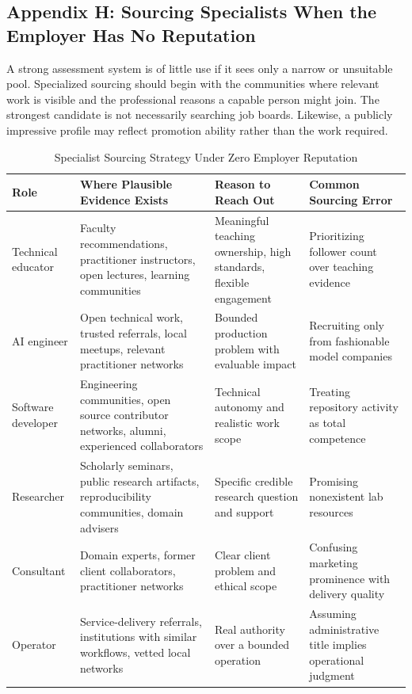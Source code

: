 \subsection*{Appendix H: Sourcing Specialists When the Employer Has No Reputation}

A strong assessment system is of little use if it sees only a narrow or unsuitable pool. Specialized sourcing should begin with the communities where relevant work is visible and the professional reasons a capable person might join. The strongest candidate is not necessarily searching job boards. Likewise, a publicly impressive profile may reflect promotion ability rather than the work required.

\begin{table}[t]
\centering
\small
\caption{Specialist Sourcing Strategy Under Zero Employer Reputation}
\label{tab:specialist_sourcing}
\begin{tabularx}{\textwidth}{p{2.5cm} p{4.6cm} p{4.2cm} p{4.2cm}}
\toprule
\textbf{Role} & \textbf{Where Plausible Evidence Exists} & \textbf{Reason to Reach Out} & \textbf{Common Sourcing Error} \\
\midrule
Technical educator & Faculty recommendations, practitioner instructors, open lectures, learning communities & Meaningful teaching ownership, high standards, flexible engagement & Prioritizing follower count over teaching evidence \\
AI engineer & Open technical work, trusted referrals, local meetups, relevant practitioner networks & Bounded production problem with evaluable impact & Recruiting only from fashionable model companies \\
Software developer & Engineering communities, open source contributor networks, alumni, experienced collaborators & Technical autonomy and realistic work scope & Treating repository activity as total competence \\
Researcher & Scholarly seminars, public research artifacts, reproducibility communities, domain advisers & Specific credible research question and support & Promising nonexistent lab resources \\
Consultant & Domain experts, former client collaborators, practitioner networks & Clear client problem and ethical scope & Confusing marketing prominence with delivery quality \\
Operator & Service-delivery referrals, institutions with similar workflows, vetted local networks & Real authority over a bounded operation & Assuming administrative title implies operational judgment \\

\end{tabularx}
\end{table}
